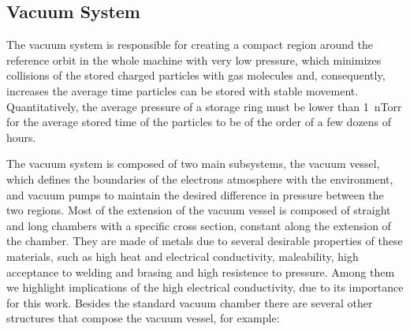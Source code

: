 \subsection{Vacuum System}

    The vacuum system is responsible for creating a compact region around the reference orbit in the whole machine with very low pressure, which minimizes collisions of the stored charged particles with gas molecules and, consequently, increases the average time particles can be stored with stable movement. Quantitatively, the average pressure of a storage ring must be lower than \SI{1}{\nano Torr} for the average stored time of the particles to be of the order of a few dozens of hours.

    The vacuum system is composed of two main subsystems, the vacuum vessel, which defines the boundaries of the electrons atmosphere with the environment, and vacuum pumps to maintain the desired difference in pressure between the two regions. Most of the extension of the vacuum vessel is composed of straight and long chambers with a specific cross section, constant along the extension of the chamber. They are made of metals due to several desirable properties of these materials, such as high heat and electrical conductivity, maleability, high acceptance to welding and brasing and high resistence to pressure. Among them we highlight implications of the high electrical conductivity, due to its importance for this work. Besides the standard vacuum chamber there are several other structures that compose the vacuum vessel, for example:
